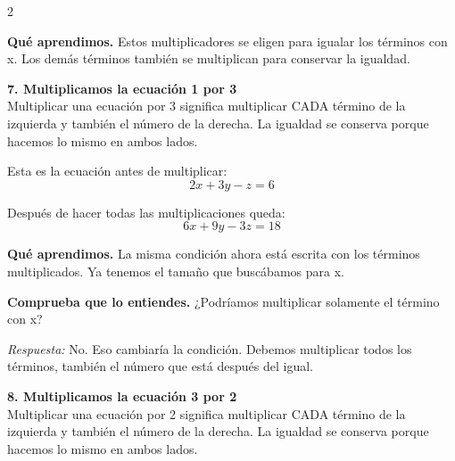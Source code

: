 \documentclass[11pt,a4paper,landscape]{article}
\begin{document}
\begin{multicols*}{2}
\begin{minipage}{\linewidth}
\par\smallskip\textbf{Qué aprendimos.} Estos multiplicadores se eligen para igualar los términos con x. Los demás términos también se multiplican para conservar la igualdad.
\end{minipage}\par\medskip
\noindent\begin{minipage}{\linewidth}\textbf{7. Multiplicamos la ecuación 1 por 3}\\[2pt]Multiplicar una ecuación por 3 significa multiplicar CADA término de la izquierda y también el número de la derecha. La igualdad se conserva porque hacemos lo mismo en ambos lados.
\par\smallskip Esta es la ecuación antes de multiplicar:
\[2x + 3y - z = 6\]
\par{}\par\smallskip
\par\smallskip Después de hacer todas las multiplicaciones queda:
\[6x + 9y - 3z = 18\]
\par\smallskip\textbf{Qué aprendimos.} La misma condición ahora está escrita con los términos multiplicados. Ya tenemos el tamaño que buscábamos para x.
\par\smallskip\textbf{Comprueba que lo entiendes.} ¿Podríamos multiplicar solamente el término con x?\par\textit{Respuesta:} No. Eso cambiaría la condición. Debemos multiplicar todos los términos, también el número que está después del igual.
\end{minipage}\par\medskip
\noindent\begin{minipage}{\linewidth}\textbf{8. Multiplicamos la ecuación 3 por 2}\\[2pt]Multiplicar una ecuación por 2 significa multiplicar CADA término de la izquierda y también el número de la derecha. La igualdad se conserva porque hacemos lo mismo en ambos lados.

\end{minipage}
\end{multicols*}
\end{document}
